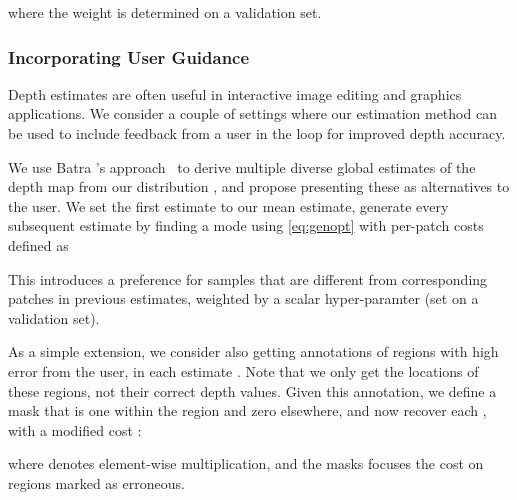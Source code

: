 \documentclass[10pt,twocolumn,letterpaper]{article}
\begin{document}
where the weight  is determined on a validation set.

\subsubsection{Incorporating User Guidance}

Depth estimates are often useful in interactive image editing and graphics applications. We consider a couple of settings where our estimation method can be used to include feedback from a user in the loop for improved depth accuracy.

 We use Batra \etal's approach~\cite{batra2012diverse} to derive multiple diverse global estimates  of the depth map  from our distribution , and propose presenting these as alternatives to the user. We set the first estimate  to our mean estimate, generate every subsequent estimate  by finding a mode using \eqref{eq:genopt} with per-patch costs  defined as

This introduces a preference for samples that are different from corresponding patches in previous estimates, weighted by a scalar hyper-paramter  (set on a validation set).

 As a simple extension, we consider also getting annotations of regions with high error from the user, in each estimate . Note that we only get the locations of these regions, not their correct depth values. Given this annotation, we define a mask  that is one within the region and zero elsewhere, and now recover each , with a modified cost :

where  denotes element-wise multiplication, and the masks focuses the cost on regions marked as erroneous.

\newcommand{\colorize}{Levin \cite{levin2004colorization}}
\newcommand{\solver}{Solver \cite{barron2016fast}}
\newcommand{\stod}{Ma \cite{ma2018sparse}}


\newcommand{\tspec}{\rowcolor{tspcolor}\cellcolor{white}&}
\renewcommand{\midrule}{\specialrule{0.1pt}{0pt}{.6pt}}
\renewcommand{\cline}[1]{\cmidrule{#1}}
\end{document}
